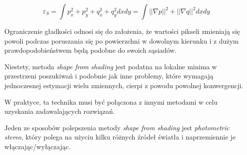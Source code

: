 \documentclass[a4paper,12pt]{article}
\begin{document}
\begin{equation}
\varepsilon_S = \int p^2_x + p^2_y + q^2_x + q^2_y dx dy = \int ||\nabla p||^2 + ||\nabla q||^2 dx dy 
\end{equation}

Ograniczenie gładkości odnosi się do założenia, że wartości pikseli zmieniają się powoli podczas poruszania się po powierzchni w dowolnym kierunku i z dużym prawdopodobieństwem będą podobne do swoich sąsiadów.

Niestety, metoda {\em shape from shading} jest podatna na lokalne minima w przestrzeni poszukiwań i podobnie jak inne problemy, które wymagają jednoczesnej estymacji wielu zmiennych, cierpi z powodu powolnej konwergencji.

W praktyce, ta technika musi być połączona z innymi metodami w celu uzyskania zadawalających rozwiązań.

Jeden ze sposobów polepszenia metody {\em shape from shading} jest {\em photometric stereo}, który polega na użyciu kilku różnych źródeł światła i naprzemiennie je włączając/wyłączając.
\end{document}
